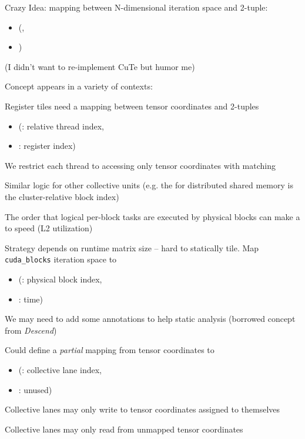 \begin{minipage}[t]{0.48\textwidth}\fixminipage
Crazy Idea: mapping between N-dimensional iteration space and 2-tuple:
\begin{itemize}
  \item (,
  \item {})
\end{itemize}

(I didn't want to re-implement CuTe but humor me)

Concept appears in a variety of contexts:


Register tiles need a mapping between tensor coordinates and 2-tuples
\begin{itemize}
  \item (: relative thread index,
  \item {}: register index)
\end{itemize}

We restrict each thread to accessing only tensor coordinates with matching 

Similar logic for other collective units (e.g. the  for distributed shared memory is the cluster-relative block index)

\end{minipage}
\hfill
\begin{minipage}[t]{0.48\textwidth}\fixminipage
{}

The order that logical per-block tasks are executed by physical blocks can make a  to speed (L2 utilization)

Strategy depends on runtime matrix size -- hard to statically tile.
Map \texttt{cuda\_blocks} iteration space to
\begin{itemize}
  \item (: physical block index,
  \item {}: time)
\end{itemize}


We may need to add some annotations to help static analysis (borrowed concept from \textit{Descend})

Could define a \textit{partial} mapping from tensor coordinates to
\begin{itemize}
  \item (: collective lane index,
  \item {}: unused)
\end{itemize}
Collective lanes may only write to tensor coordinates assigned to themselves

Collective lanes may only read from unmapped tensor coordinates
\end{minipage}

